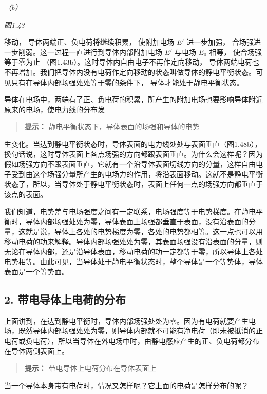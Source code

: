 \emph{（b）}

\emph{图1.43}

移动， 导体两端正、负电荷将继续积累， 使附加电场 \(E'\) 进一步加强，
合场强进一步削弱。这一过程一直进行到导体内部附加电场 \(E'\) 与电场
\(E_0\) 相等， 使合场强等于零为止
（图1.43b）。这时导体内自由电子不再作定向移动，
导体两端电荷也不再增加。我们把导体内没有电荷作定向移动的状态叫做导体的静电平衡状态。可见只有在导体内部场强处处等于零的条件下，
导体才能处于静电平衡状态。

导体在电场中，两端有了正、负电荷的积累，所产生的附加电场也要影响导体附近原来的电场，使电力线的分布发

\begin{quote}
\textbf{提示：} 静电平衡状态下，导体表面的场强和导体的电势
\end{quote}

生变化。当达到静电平衡状态时，导体表面的电力线处处与表面垂直（图1.48b），换句话说，这时导体表面上各点场强的方向都跟表面垂直。为什么会这样呢？因为假如场强方向不跟表面垂直，它就有一个沿导体表面切线方向的分量，这样自由电子受到由这个场强分量所产生的电场力的作用，将沿表面移动。这就不是静电平衡状态了，所以，当导体处于静电平衡状态时，表面上任何一点的场强方向都垂直于该点的表面。

我们知道，电势差与电场强度之间有一定联系，电场强度等于电势梯度。在静电平衡时，导体内部场强处处为零，导体表面上场强都垂直于表面，没有沿表面的分量，这就是说，导体上各处的电势梯度为零，各处的电势都相等。这一点也可以用移动电荷的功来解释。导体内部场强处处为零，其表面场强没有沿表面的分量，则无论在导体内部，还是沿导体表面，移动电荷的功一定都等于零，所以导体上各处电势相等。由此可见，当导体处于静电平衡状态时，整个导体是一个等势体，导体表面是一个等势面。

\subsection{2.
带电导体上电荷的分布}\label{ux5e26ux7535ux5bfcux4f53ux4e0aux7535ux8377ux7684ux5206ux5e03-1}

上面讲到，在达到静电平衡时，导体内部场强处处为零。因为有电荷就要产生电场，既然导体内部场强处处为零，则导体内部就不可能有净电荷（即未被抵消的正电荷或负电荷），所以当导体在外电场中时，由静电感应产生的正、负电荷都分布在导体两侧表面上。

\begin{quote}
\textbf{提示：} 带电导体上电荷分布在导体表面上
\end{quote}

当一个导体本身带有电荷时，情况又怎样呢？它上面的电荷是怎样分布的呢？


